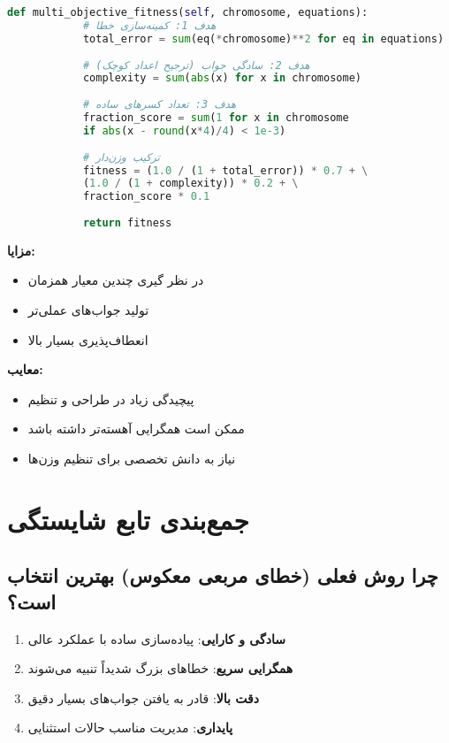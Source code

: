 \documentclass[12pt,a4paper]{article}
\newenvironment{ltrcode}{\lr\bgroup}{\egroup}
\begin{document}
	\begin{ltrcode}
		\begin{lstlisting}[language=Python, caption=تابع شایستگی چندهدفه]
			def multi_objective_fitness(self, chromosome, equations):
			# هدف 1: کمینه‌سازی خطا
			total_error = sum(eq(*chromosome)**2 for eq in equations)
			
			# هدف 2: سادگی جواب (ترجیح اعداد کوچک)
			complexity = sum(abs(x) for x in chromosome)
			
			# هدف 3: تعداد کسرهای ساده
			fraction_score = sum(1 for x in chromosome 
			if abs(x - round(x*4)/4) < 1e-3)
			
			# ترکیب وزن‌دار
			fitness = (1.0 / (1 + total_error)) * 0.7 + \
			(1.0 / (1 + complexity)) * 0.2 + \
			fraction_score * 0.1
			
			return fitness
		\end{lstlisting}
	\end{ltrcode}
	
	\textbf{مزایا:}
	\begin{itemize}
		\item در نظر گیری چندین معیار همزمان
		\item تولید جواب‌های عملی‌تر
		\item انعطاف‌پذیری بسیار بالا
	\end{itemize}
	
	\textbf{معایب:}
	\begin{itemize}
		\item پیچیدگی زیاد در طراحی و تنظیم
		\item ممکن است همگرایی آهسته‌تر داشته باشد
		\item نیاز به دانش تخصصی برای تنظیم وزن‌ها
	\end{itemize}
	
	\section{جمع‌بندی تابع شایستگی}
	
	\subsection{چرا روش فعلی (خطای مربعی معکوس) بهترین انتخاب است؟}
	
	\begin{enumerate}
		\item \textbf{سادگی و کارایی}: پیاده‌سازی ساده با عملکرد عالی
		\item \textbf{همگرایی سریع}: خطاهای بزرگ شدیداً تنبیه می‌شوند
		\item \textbf{دقت بالا}: قادر به یافتن جواب‌های بسیار دقیق
		\item \textbf{پایداری}: مدیریت مناسب حالات استثنایی
	\end{enumerate}
	
\end{document}
